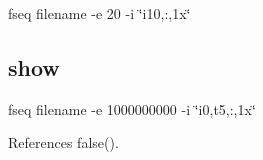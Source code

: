 fseq filename -\/e 20 -\/i \char`\"{}i10,\textquotesingle{}\textquotesingle{}\+:\textquotesingle{}\textquotesingle{},1x\char`\"{} \subsection*{show}

fseq filename -\/e 1000000000 -\/i \char`\"{}i0,t5,\textquotesingle{}\textquotesingle{}\+:\textquotesingle{}\textquotesingle{},1x\char`\"{} 

References false().

